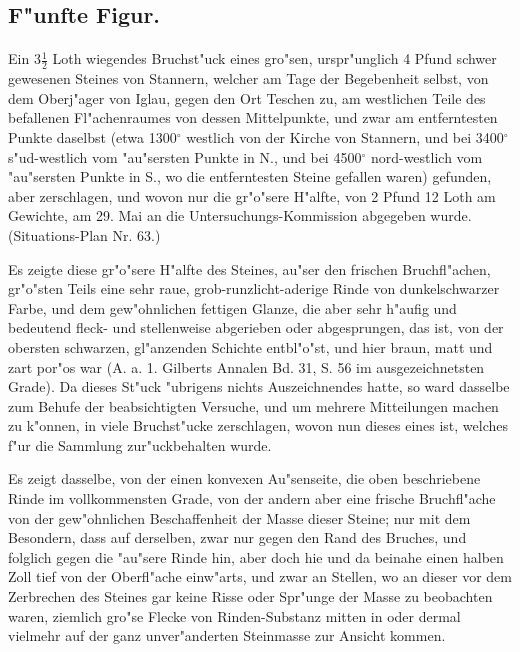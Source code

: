 \documentclass[a4paper, 11pt, oneside, german]{article}
\begin{document}
\subsection{F"unfte Figur.}
\paragraph{}
Ein $3\frac{1}{2}$ Loth wiegendes Bruchst"uck eines gro"sen, urspr"unglich 4 Pfund schwer gewesenen Steines von Stannern, welcher am Tage der Begebenheit selbst, von dem Oberj"ager von Iglau, gegen den Ort Teschen zu, am westlichen Teile des befallenen Fl"achenraumes von dessen Mittelpunkte, und zwar am entferntesten Punkte daselbst (etwa 1300$^{\circ}$ westlich von der Kirche von Stannern, und bei 3400$^{\circ}$ s"ud-westlich vom "au"sersten Punkte in N., und bei 4500$^{\circ}$ nord-westlich vom "au"sersten Punkte in S., wo die entferntesten Steine gefallen waren) gefunden, aber zerschlagen, und wovon nur die gr"o"sere H"alfte, von 2 Pfund 12 Loth am Gewichte, am 29. Mai an die Untersuchungs-Kommission abgegeben wurde. (Situations-Plan Nr. 63.)

Es zeigte diese gr"o"sere H"alfte des Steines, au"ser den frischen Bruchfl"achen, gr"o"sten Teils eine sehr raue, grob-runzlicht-aderige Rinde von dunkelschwarzer Farbe, und dem gew"ohnlichen fettigen Glanze, die aber sehr h"aufig und bedeutend fleck- und stellenweise abgerieben oder abgesprungen, das ist, von der obersten schwarzen, gl"anzenden Schichte entbl"o"st, und hier braun, matt und zart por"os war (A. a. 1. Gilberts Annalen Bd. 31, S. 56 im ausgezeichnetsten Grade). Da dieses St"uck "ubrigens nichts Auszeichnendes hatte, so ward dasselbe zum Behufe der beabsichtigten Versuche, und um mehrere Mitteilungen machen zu k"onnen, in viele Bruchst"ucke zerschlagen, wovon nun dieses eines ist, welches f"ur die Sammlung zur"uckbehalten wurde.

Es zeigt dasselbe, von der einen konvexen Au"senseite, die oben beschriebene Rinde im vollkommensten Grade, von der andern aber eine frische Bruchfl"ache von der gew"ohnlichen Beschaffenheit der Masse dieser Steine; nur mit dem Besondern, dass auf derselben, zwar nur gegen den Rand des Bruches, und folglich gegen die "au"sere Rinde hin, aber doch hie und da beinahe einen halben Zoll tief von der Oberfl"ache einw"arts, und zwar an Stellen, wo an dieser vor dem Zerbrechen des Steines gar keine Risse oder Spr"unge der Masse zu beobachten waren, ziemlich gro"se Flecke von Rinden-Substanz mitten in oder dermal vielmehr auf der ganz unver"anderten Steinmasse zur Ansicht kommen.
\end{document}
